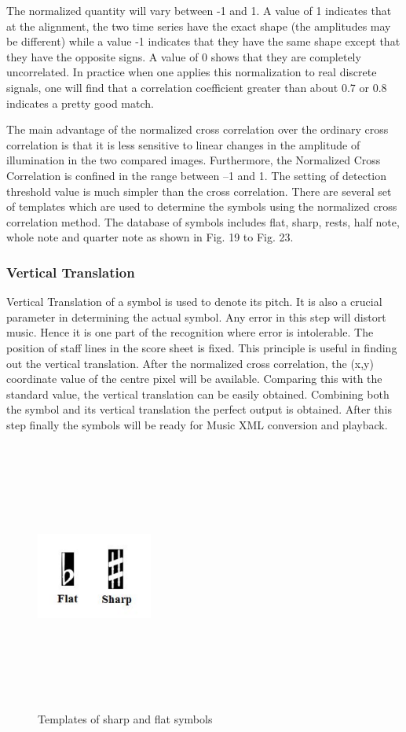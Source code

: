 \documentclass[journal]{IEEEtran}
\begin{document}
The normalized quantity will vary between -1 and 1. A value of 1 indicates that at the alignment, the two time series have the exact shape (the amplitudes may be different) while a value -1 indicates that they have the same shape except that they have the opposite signs. A value of 0 shows that they are completely uncorrelated. In practice when one applies this normalization to real discrete signals, one will find that a correlation coefficient greater than about 0.7 or 0.8 indicates a pretty good match. \par

The main advantage of the normalized cross correlation over the ordinary cross correlation is that it is less sensitive to linear changes in the amplitude of illumination in the two compared images. Furthermore, the Normalized Cross Correlation is confined in the range between –1 and 1. The setting of detection threshold value is much simpler than the cross correlation. There are several set of templates which are used to determine the symbols using the normalized
cross correlation method. The database of symbols includes flat, sharp, rests, half note, whole note and quarter note as shown in Fig. 19 to Fig. 23.

\subsubsection{Vertical Translation}
Vertical Translation of a symbol is used to denote its pitch. It is also a crucial parameter in determining the actual symbol. Any error in this step will distort music. Hence it is one part of the recognition where error is intolerable. The position of staff lines in the score sheet is fixed. This principle is useful in finding out the vertical translation. After the normalized cross correlation, the (x,y) coordinate value of the centre pixel will be available. Comparing this with the standard value, the vertical translation can be easily obtained. Combining both the symbol and its vertical translation the perfect output is obtained. After this step finally the symbols will be ready for Music
XML conversion and playback.

\begin{figure}
\includegraphics[width=1.5in,height=3.5in,clip,keepaspectratio]{resources/implementation/template_flat_sharp}
\centering
\caption{Templates of sharp and flat symbols}
\end{figure}
\end{document}
